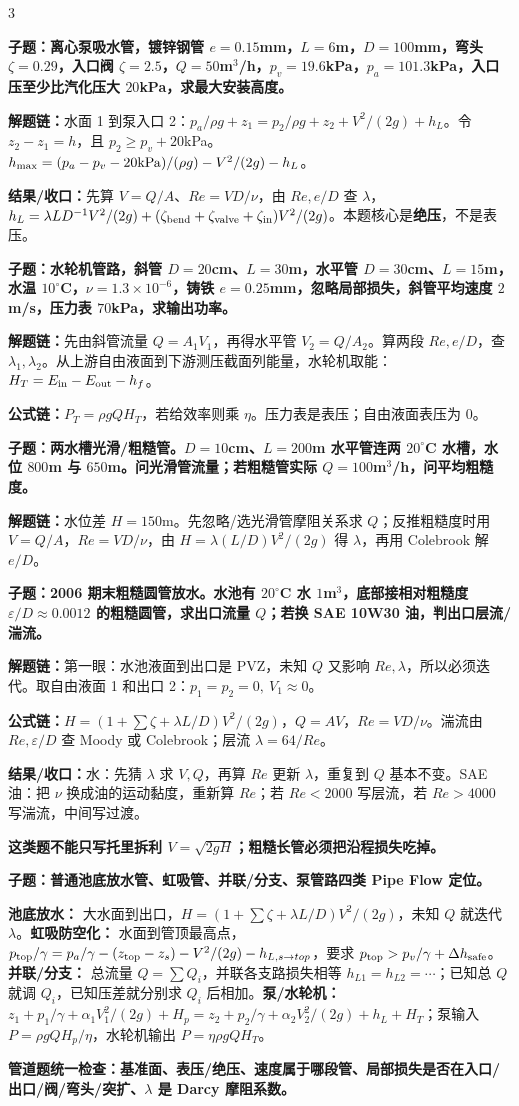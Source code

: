\documentclass[a4paper]{article}
\newcommand{\qt}[1]{\vspace{1pt}\colorbox{Q}{\parbox{\dimexpr\linewidth-2\fboxsep}{\color{white}\bfseries #1}}\par}
\newcommand{\ans}[1]{\colorbox{G}{\parbox{\dimexpr\linewidth-2\fboxsep}{#1}}\par}
\newcommand{\warn}[1]{\colorbox{Y}{\parbox{\dimexpr\linewidth-2\fboxsep}{\color{E}\bfseries #1}}\par}
\newcommand{\chain}[1]{{\color{A}\bfseries 解题链：}#1\par}
\newcommand{\res}[1]{{\color{E}\bfseries 结果/收口：}#1\par}
\newcommand{\form}[1]{{\color{M}\bfseries 公式链：}#1\par}
\begin{document}
\begin{multicols}{3}
\qt{子题：离心泵吸水管，镀锌钢管 $e=0.15$mm，$L=6$m，$D=100$mm，弯头 $\zeta=0.29$，入口阀 $\zeta=2.5$，$Q=50$m$^3$/h，$p_v=19.6$kPa，$p_a=101.3$kPa，入口压至少比汽化压大 $20$kPa，求最大安装高度。}
\chain{水面 1 到泵入口 2：$p_a/\rho g+z_1=p_2/\rho g+z_2+V^2/(2g)+h_L$。令 $z_2-z_1=h$，且 $p_2\ge p_v+20$kPa。$h_{\max}=(p_a-p_v-20{\rm kPa})/(\rho g)-V^2/(2g)-h_L$。}
\res{先算 $V=Q/A$、$Re=VD/\nu$，由 $Re,e/D$ 查 $\lambda$，$h_L=\lambda LD^{-1}V^2/(2g)+(\zeta_{\rm bend}+\zeta_{\rm valve}+\zeta_{\rm in}) V^2/(2g)$。本题核心是\textbf{绝压}，不是表压。}

\qt{子题：水轮机管路，斜管 $D=20$cm、$L=30$m，水平管 $D=30$cm、$L=15$m，水温 $10^\circ$C，$\nu=1.3\times10^{-6}$，铸铁 $e=0.25$mm，忽略局部损失，斜管平均速度 $2$m/s，压力表 $70$kPa，求输出功率。}
\chain{先由斜管流量 $Q=A_1V_1$，再得水平管 $V_2=Q/A_2$。算两段 $Re,e/D$，查 $\lambda_1,\lambda_2$。从上游自由液面到下游测压截面列能量，水轮机取能：$H_T=E_{\rm in}-E_{\rm out}-h_f$。}
\form{$P_T=\rho gQH_T$，若给效率则乘 $\eta$。压力表是表压；自由液面表压为 0。}

\qt{子题：两水槽光滑/粗糙管。$D=10$cm、$L=200$m 水平管连两 $20^\circ$C 水槽，水位 $800$m 与 $650$m。问光滑管流量；若粗糙管实际 $Q=100$m$^3$/h，问平均粗糙度。}
\chain{水位差 $H=150$m。先忽略/选光滑管摩阻关系求 $Q$；反推粗糙度时用 $V=Q/A$，$Re=VD/\nu$，由 $H=\lambda(L/D)V^2/(2g)$ 得 $\lambda$，再用 Colebrook 解 $e/D$。}

\qt{子题：2006 期末粗糙圆管放水。水池有 $20^\circ$C 水 $1$m$^3$，底部接相对粗糙度 $\varepsilon/D\approx0.0012$ 的粗糙圆管，求出口流量 $Q$；若换 SAE 10W30 油，判出口层流/湍流。}
\chain{第一眼：水池液面到出口是 PVZ，未知 $Q$ 又影响 $Re,\lambda$，所以必须迭代。取自由液面 1 和出口 2：$p_1=p_2=0,\ V_1\approx0$。}
\form{$H=\left(1+\sum\zeta+\lambda L/D\right)V^2/(2g)$，$Q=AV$，$Re=VD/\nu$。湍流由 $Re,\varepsilon/D$ 查 Moody 或 Colebrook；层流 $\lambda=64/Re$。}
\res{水：先猜 $\lambda$ 求 $V,Q$，再算 $Re$ 更新 $\lambda$，重复到 $Q$ 基本不变。SAE 油：把 $\nu$ 换成油的运动黏度，重新算 $Re$；若 $Re<2000$ 写层流，若 $Re>4000$ 写湍流，中间写过渡。}
\warn{这类题不能只写托里拆利 $V=\sqrt{2gH}$；粗糙长管必须把沿程损失吃掉。}

\qt{子题：普通池底放水管、虹吸管、并联/分支、泵管路四类 Pipe Flow 定位。}
\ans{\textbf{池底放水：} 大水面到出口，$H=(1+\sum\zeta+\lambda L/D)V^2/(2g)$，未知 $Q$ 就迭代 $\lambda$。\textbf{虹吸防空化：} 水面到管顶最高点，$p_{\rm top}/\gamma=p_a/\gamma-(z_{\rm top}-z_s)-V^2/(2g)-h_{L,s\to top}$，要求 $p_{\rm top}>p_v/\gamma+\Delta h_{\rm safe}$。\textbf{并联/分支：} 总流量 $Q=\sum Q_i$，并联各支路损失相等 $h_{L1}=h_{L2}=\cdots$；已知总 $Q$ 就调 $Q_i$，已知压差就分别求 $Q_i$ 后相加。\textbf{泵/水轮机：} $z_1+p_1/\gamma+\alpha_1V_1^2/(2g)+H_p=z_2+p_2/\gamma+\alpha_2V_2^2/(2g)+h_L+H_T$；泵输入 $P=\rho gQH_p/\eta$，水轮机输出 $P=\eta\rho gQH_T$。}
\warn{管道题统一检查：基准面、表压/绝压、速度属于哪段管、局部损失是否在入口/出口/阀/弯头/突扩、$\lambda$ 是 Darcy 摩阻系数。}


\end{multicols}
\end{document}
